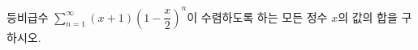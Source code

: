 등비급수 $\displaystyle\sum_{n=1}^{\infty}(x+1)\left(1-\dfrac{x}{2}\right)^n$이 수렴하도록 하는 모든 정수 $x$의 값의 합을 구하시오.
